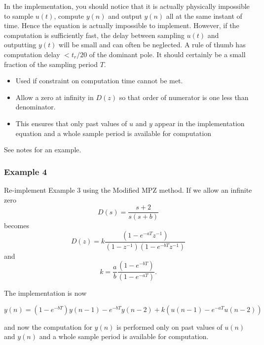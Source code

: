 In the implementation, you should notice that it is actually physically impossible to sample $u(t)$, compute $y(n)$ and output $y(n)$ all at the same instant of time. Hence the equation is actually impossible to implement. However, if the computation is sufficiently fast, the delay between sampling $u(t)$ and outputting $y(t)$ will be small and can often be neglected.  A rule of thumb has computation delay $< t_r/20$ of the dominant pole. It should certainly be a small fraction of the sampling period $T$. 

\begin{slide}\label{slides:l11s26}
	\begin{itemize}
	\item
	Used if constraint on computation time cannot be met.
	
	\item Allow a zero at infinity in $D(z)$ so that order of numerator is one less than denominator.
	
	\item This ensures that only past values of $u$ and $y$ appear in the implementation equation and a whole sample period is available for computation
	
\end{itemize}
See notes for an example.
\end{slide}

\subsubsection*{Example 4}

Re-implement Example 3 using the Modified MPZ method. If we allow an infinite zero $$D(s)=\frac{s+2}{s(s+b)}$$ becomes $$D(z)=k\frac{(1-e^{-aT}z^{-1})}{(1-z^{-1})(1-e^{-bT}z^{-1})}$$ and $$k=\frac{a}{b}\frac{(1-e^{-bT})}{(1-e^{-aT})}.$$

The implementation is now

$$y(n) = (1 - e^{-bT})y(n-1)-e^{-bT}y(n-2)+k(u(n-1)-e^{-aT}u(n-2))$$

and now the computation for $y(n)$ is performed only on past values of $u(n)$ and $y(n)$ and a whole sample period is available for computation. 



\endinput

